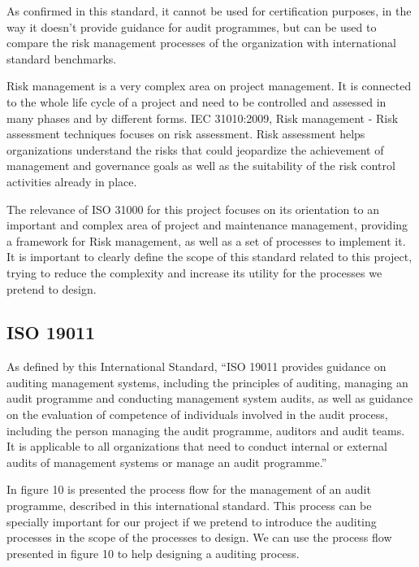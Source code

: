 As confirmed in this standard, it cannot be used for certification purposes, in the way it doesn't provide guidance for audit programmes, but can be used to compare the risk management processes of the organization with international standard benchmarks.\par
Risk management is a very complex area on project management. It is connected to the whole life cycle of a project and need to be controlled and assessed in many phases and by different forms. IEC 31010:2009, Risk management - Risk assessment techniques focuses on risk assessment. Risk assessment helps organizations understand the risks that could jeopardize the achievement of management and governance goals as well as the suitability of the risk control activities already in place.\cite{IEC31010}\par
The relevance of ISO 31000 for this project focuses on its orientation to an important and complex area of project and maintenance management, providing a framework for Risk management, as well as a set of processes to implement it. It is important to clearly define the scope of this standard related to this project, trying to reduce the complexity and increase its utility for the processes we pretend to design.


\subsection{ISO 19011}

As defined by this International Standard, ``ISO 19011 provides guidance on auditing management systems, including the principles of auditing, managing an audit programme and conducting management system audits, as well as guidance on the evaluation of competence of individuals involved in the audit process, including the person managing the audit programme, auditors and audit teams. It is applicable to all organizations that need to conduct internal or external audits of management systems or manage an audit programme.''\cite{ISO19011}\par
In figure 10 is presented the process flow for the management of an audit programme, described in this international standard. This process can be specially important for our project if we pretend to introduce the auditing processes in the scope of the processes to design. We can use the process flow presented in figure 10 to help designing a auditing process.

